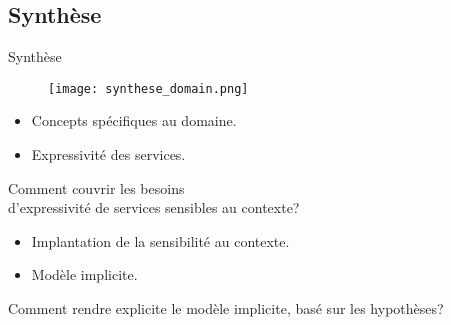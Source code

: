 


\subsection{Synthèse}
\begin{frame}{Synthèse}
  \begin{minipage}[t]{0.3\linewidth}
    \begin{figure}
      \texttt{[image: synthese\_domain.png]}
    \end{figure}
  \end{minipage}
  \begin{minipage}[t]{0.68\linewidth}
    \begin{itemize}
      \item Concepts spécifiques au domaine.
      \item Expressivité des services.
    \end{itemize}
    \begin{questionbox}
      Comment couvrir les besoins \\d'expressivité de services sensibles au contexte?
    \end{questionbox}
    \vfill
    \begin{itemize}
      \item Implantation de la sensibilité au contexte.
      \item Modèle implicite.%
    \end{itemize}
    \begin{questionbox}
      Comment rendre explicite le modèle implicite, basé sur les hypothèses?
    \end{questionbox}
  \end{minipage}
\end{frame}